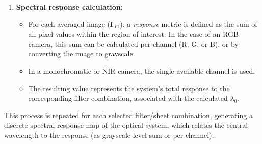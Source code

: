 \begin{enumerate}
    \item \textbf{Spectral response calculation:}
    \begin{itemize}
        \item For each averaged image (\(\mathbf{I}_{\text{filt}}\)), a \emph{response} metric is defined as the sum of all pixel values within the region of interest. In the case of an RGB camera, this sum can be calculated per channel (R, G, or B), or by converting the image to grayscale.
        \item In a monochromatic or NIR camera, the single available channel is used.
        \item The resulting value represents the system’s total response to the corresponding filter combination, associated with the calculated \(\lambda_0\).
    \end{itemize}
\end{enumerate}

\noindent
This process is repeated for each selected filter/sheet combination, generating a discrete spectral response map of the optical system, which relates the central wavelength to the response (as grayscale level sum or per channel).

